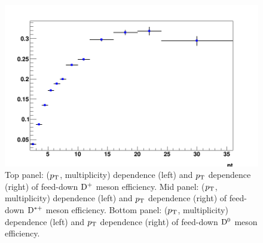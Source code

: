 \begin{figure}[h]
	\includegraphics[width=.48\linewidth]{figures/Effs/EfficiencyMap_1D_Dzero_b_RefPtBins_wLimAcc_Plot.png}
	\caption{Top panel: ($p_{\rm T}$, multiplicity) dependence (left) and $p_{\rm T}$ dependence (right) of feed-down ${\rm D^+}$ meson efficiency.
Mid panel: ($p_{\rm T}$, multiplicity) dependence (left) and $p_{\rm T}$ dependence (right) of feed-down ${\rm D^{*+}}$ meson efficiency.
Bottom panel: ($p_{\rm T}$, multiplicity) dependence (left) and $p_{\rm T}$ dependence (right) of feed-down ${\rm D^0}$ meson efficiency.}
	\label{fig:dEffFD}	
\end{figure}
\clearpage

\clearpage 
